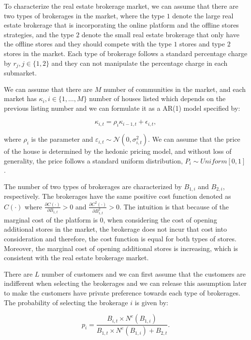 \documentclass[12pt]{article}
\begin{document}
To characterize the real estate brokerage market, we can assume that there are two types of brokerages in the market, where the type $1$ denote the large real estate brokerage that is incorporating the online platform and the offline stores strategies, and the type $2$ denote the small real estate brokerage that only have the offline stores and they should compete with the type $1$ stores and type $2$ stores in the market. Each type of brokerage follows a standard percentage charge by $r_j, j \in \{1, 2\}$ and they can not manipulate the percentage charge in each submarket.

We can assume that there are $M$ number of communities in the market, and each market has $\kappa_i, i \in \{1, \ldots, M\}$ number of houses listed which depends on the previous listing number and we can formulate it as a AR(1) model specified by:

\begin{equation}
  \kappa_{i, t} = \rho_{i} \kappa_{i-1, t} + \epsilon_{i, t}, \label{eq:ar1}
\end{equation}

where $\rho_i$ is the parameter and $\varepsilon_{i, t} \sim \mathcal{N}(0, \sigma_{i, t}^2)$. We can assume that the price of the house is determined by the hedonic pricing model, and without loss of generality, the price follows a standard uniform distribution, $P_i \sim Uniform[0, 1]$.

The number of two types of brokerages are characterized by $B_{1, i}$ and $B_{2, i}$, respectively. The brokerages have the same positive cost function denoted as $C(\cdot)$ where $\frac{\partial C(\cdot)}{\partial B_{1, t}} > 0$ and $\frac{\partial C^2(\cdot)}{\partial B_{1, t}^2} > 0$. The intuition is that because of the marginal cost of the platform is $0$, when considering the cost of opening additional stores in the market, the brokerage does not incur that cost into consideration and therefore, the cost function is equal for both types of stores. Moreover, the marginal cost of opening additional stores is increasing, which is consistent with the real estate brokerage market.

There are $L$ number of customers and we can first assume that the customers are indifferent when selecting the brokerages and we can release this assumption later to make the customers have private preference towards each type of brokerages. The probability of selecting the brokerage $i$ is given by:

\begin{equation}
  p_i = \frac{B_{i, t} \times N^e(B_{1, i})}{B_{1, t} \times N^e(B_{1, i}) + B_{2, t}}. \label{eq:prob}
\end{equation}
\end{document}
